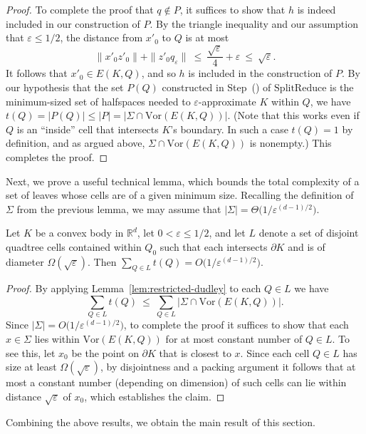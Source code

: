 \documentclass[11pt]{article}   \usepackage[letterpaper,hmargin=2.1cm,vmargin=3cm]{geometry}
\newcommand{\RE}{\mathbb{R}}    \newcommand{\ZZ}{\mathbb{Z}}    \newcommand{\eps}{\varepsilon}  \newcommand{\ST}{\,:\,}         \newcommand{\sq}{\square}
\newcommand{\alg}{\textrm{SplitReduce}}
\newcommand{\Vor}{\mathrm{Vor}}
\begin{document}
\begin{proof}
To complete the proof that $q \notin P$, it suffices to show that $h$ is indeed included in our construction of $P$. By the triangle inequality and our assumption that $\eps \le 1/2$, the distance from $x'_0$ to $Q$ is at most
\[
	\|x'_0 z'_0\| + \|z'_0 q_{\eps}\|
		~ \le ~ \frac{\sqrt{\eps}}{4} + \eps
		~ \le ~ \sqrt{\eps}.
\]
It follows that $x'_0 \in E(K,Q)$, and so $h$ is included in the construction of $P$. By our hypothesis that the set $P(Q)$ constructed in Step~(\stepapx) of ${\alg}$ is the minimum-sized set of halfspaces needed to $\eps$-approximate $K$ within $Q$, we have $t(Q) = |P(Q)| \le |P| = |\Sigma \cap \Vor(E(K,Q))|$. (Note that this works even if $Q$ is an ``inside'' cell that intersects $K$'s boundary. In such a case $t(Q) = 1$ by definition, and as argued above, $\Sigma \cap \Vor(E(K,Q))$ is nonempty.) This completes the proof.
\end{proof}


Next, we prove a useful technical lemma, which bounds the total complexity of a set of leaves whose cells are of a given minimum size. Recalling the definition of $\Sigma$ from the previous lemma, we may assume that $|\Sigma| = \Theta\big(1/\eps^{(d-1)/2}\big)$.

\begin{lemma} \label{lem:space-bound}
Let $K$ be a convex body in $\RE^d$, let $0 < \eps \le 1/2$, and let $L$ denote a set of disjoint quadtree cells contained within $Q_0$ such that each intersects $\partial K$ and is of diameter $\Omega(\sqrt{\eps})$. Then $\sum_{Q \in L} t(Q) = O\big(1/\eps^{(d-1)/2}\big)$.
\end{lemma}


\begin{proof}
By applying Lemma~\ref{lem:restricted-dudley} to each $Q \in L$ we have
\[
  \sum_{Q \in L} t(Q) ~\le~ \sum_{Q \in L} |\Sigma \cap \Vor(E(K,Q))|.
\]
Since $|\Sigma| = O\big(1/\eps^{(d-1)/2}\big)$, to complete the proof it suffices to show that each $x \in \Sigma$ lies within $\Vor(E(K,Q))$ for at most constant number of $Q \in L$. To see this, let $x_0$ be the point on $\partial K$ that is closest to $x$. Since each cell $Q \in L$ has size at least $\Omega(\sqrt{\eps})$, by disjointness and a packing argument it follows that at most a constant number (depending on dimension) of such cells can lie within distance $\sqrt{\eps}$ of $x_0$, which establishes the claim.
\end{proof}


Combining the above results, we obtain the main result of this section.
\end{document}
